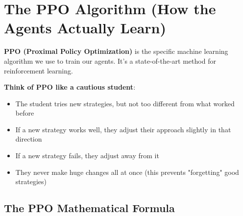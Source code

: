 \documentclass[11pt]{article}
\begin{document}
\section{The PPO Algorithm (How the Agents Actually Learn)}

\begin{foundation}
\textbf{PPO (Proximal Policy Optimization)} is the specific machine learning algorithm we use to train our agents. It's a state-of-the-art method for reinforcement learning.
\end{foundation}

\begin{intuition}
\textbf{Think of PPO like a cautious student}:
\begin{itemize}
\item The student tries new strategies, but not too different from what worked before
\item If a new strategy works well, they adjust their approach slightly in that direction
\item If a new strategy fails, they adjust away from it
\item They never make huge changes all at once (this prevents "forgetting" good strategies)
\end{itemize}
\end{intuition}

\subsection{The PPO Mathematical Formula}
\end{document}
